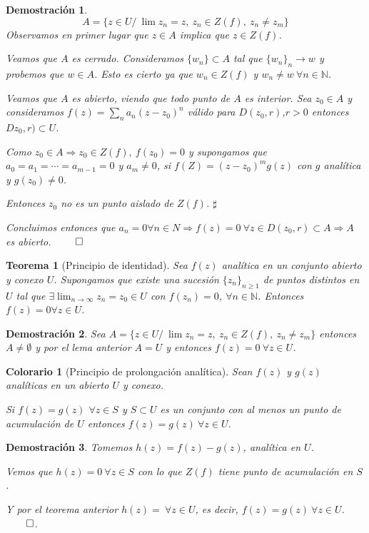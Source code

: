 \documentclass[10pt]{book}
\newtheorem{theorem}{Teorema}[chapter]
\newtheorem*{dem}{Demostración}
\newtheorem{col}{Colorario}[chapter]
\newcommand{\N}{\mathbb{N}}
\begin{document}
\begin{dem}
$$A = \{z\in U /\ \lim z_n = z,\ z_n\in Z(f),\ z_n\neq z_m\}$$
Observamos en primer lugar que $z\in A$ implica que $z\in Z(f)$.

Veamos que $A$ es cerrado. Consideramos $\{w_n\}\subset A$ tal que $\{w_n\}_n\to w$ y probemos que $w \in A$. Esto es cierto ya que $w_n\in Z(f)$ y $w_n\neq w\ \forall n\in\N$.

Veamos que $A$ es abierto, viendo que todo punto de $A$ es interior. Sea $z_0\in A$ y consideramos $f(z) = \sum_n a_n (z-z_0)^n$ válido para $D(z_0,r)$,$r>0$ entonces $Dz_0,r)\subset U$.

Como $z_0 \in A \Rightarrow z_0\in Z(f),\ f(z_0) = 0$ y supongamos que $a_0 = a_1 = \cdots=a_{m-1} = 0$ y $ a_m\neq 0$, si $f(Z) = (z-z_0)^m g(z)$ con $g$ analítica y $g(z_0)\neq 0$.

Entonces $z_0$ no es un punto aislado de $Z(f)$. $\sharp$

Concluimos entonces que $a_n = 0 \forall n\in N\Rightarrow f(z)=0\ \forall z \in  D(z_0,r)\subset A \Rightarrow A$ es abierto. $\qed$
\end{dem}


\begin{theorem}[Principio de identidad]
Sea $f(z)$ analítica en un conjunto abierto y conexo $U$. Supongamos que  existe una sucesión $\{z_n\}_{n\geq 1}$ de puntos distintos en $U$ tal que $\exists \lim_{n\to \infty}z_n = z_0 \in U$ con $f(z_n)=0$, $\forall n \in \N$.  Entonces $f(z) =0 \forall z \in U$.
\end{theorem}

\begin{dem}
Sea $A = \{z\in U /\ \lim z_n = z,\ z_n\in Z(f),\ z_n\neq z_m\}$ entonces $A\neq \emptyset$ y por el lema anterior $A = U$ y entonces $f(z) = 0\ \forall z\in U$.
\end{dem}


\begin{col}[Principio de prolongación analítica]
Sean $f(z)$ y $g(z)$ analíticas en un abierto $U$ y conexo.

Si $f(z) = g(z)$ $\forall z\in S$ y $S\subset U$ es un conjunto con al menos un punto de acumulación de $U$ entonces $f(z) = g(z)\ \forall z\in U$.
\end{col}

\begin{dem}
Tomemos $h(z) = f(z)-g(z)$, analítica en $U$.

Vemos que $h(z) = 0\ \forall z \in S$ con lo que $Z(f)$ tiene punto de acumulación en $S$.

Y por el teorema anterior $h(z)= \ \forall z\in U$, es decir, $f(z) = g(z) \ \forall z \in U$. $\qed$.
\end{dem}
\end{document}
